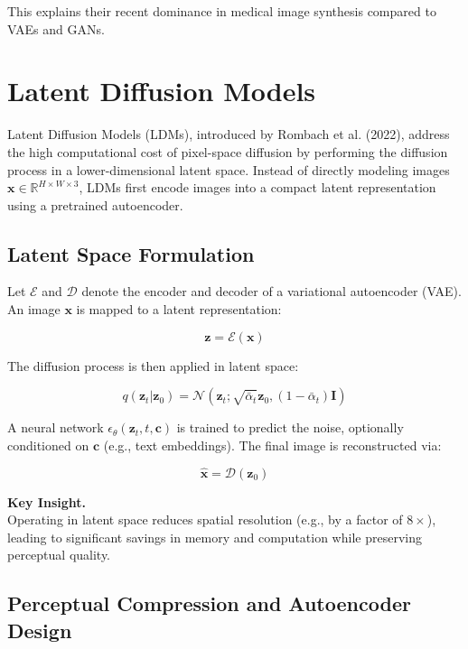 This explains their recent dominance in medical image synthesis compared to VAEs and GANs.

\section{Latent Diffusion Models}

Latent Diffusion Models (LDMs), introduced by Rombach et al. (2022), address the high computational cost of pixel-space diffusion by performing the diffusion process in a lower-dimensional latent space. Instead of directly modeling images $\mathbf{x} \in \mathbb{R}^{H \times W \times 3}$, LDMs first encode images into a compact latent representation using a pretrained autoencoder.

\subsection{Latent Space Formulation}

Let $\mathcal{E}$ and $\mathcal{D}$ denote the encoder and decoder of a variational autoencoder (VAE). An image $\mathbf{x}$ is mapped to a latent representation:

\begin{equation}
\mathbf{z} = \mathcal{E}(\mathbf{x})
\end{equation}

The diffusion process is then applied in latent space:

\begin{equation}
q(\mathbf{z}_t | \mathbf{z}_0) = \mathcal{N}(\mathbf{z}_t; \sqrt{\bar{\alpha}_t}\mathbf{z}_0, (1-\bar{\alpha}_t)\mathbf{I})
\end{equation}

A neural network $\epsilon_\theta(\mathbf{z}_t, t, \mathbf{c})$ is trained to predict the noise, optionally conditioned on $\mathbf{c}$ (e.g., text embeddings). The final image is reconstructed via:

\begin{equation}
\hat{\mathbf{x}} = \mathcal{D}(\mathbf{z}_0)
\end{equation}

\vspace{0.5em}
\noindent
\textbf{Key Insight.} \\
Operating in latent space reduces spatial resolution (e.g., by a factor of $8\times$), leading to significant savings in memory and computation while preserving perceptual quality.

\subsection{Perceptual Compression and Autoencoder Design}

